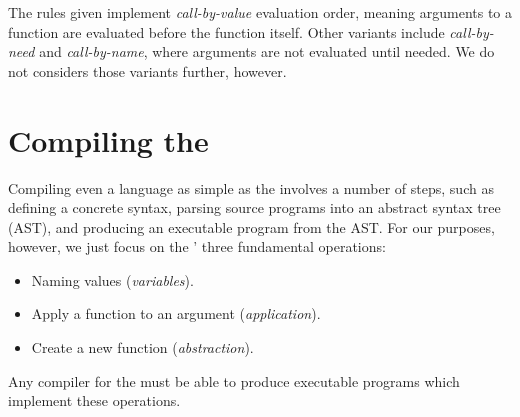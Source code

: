 \documentclass[12pt]{report}
\begin{document}
The rules given implement \emph{call-by-value} evaluation order,
meaning arguments to a function are evaluated before the function
itself. Other variants include \emph{call-by-need} and
\emph{call-by-name}, where arguments are not evaluated until
needed. We do not considers those variants further, however.

\section{Compiling the \LamA}
\label{sec_lang1}

Compiling even a language as simple as the \lamA involves a number of
steps, such as defining a concrete syntax, parsing source programs
into an abstract syntax tree (AST), and producing an executable
program from the AST. For our purposes, however, we just focus on the
\lamA' three fundamental operations:

\begin{itemize}
\item Naming values (\emph{variables}).
\item Apply a function to an argument (\emph{application}).
\item Create a new function (\emph{abstraction}). 
\end{itemize}

Any compiler for the \lamA must be able to produce executable programs
which implement these operations. 

\end{document}
